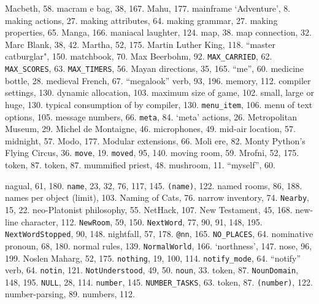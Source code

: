 {{{Macbeth, 58.
macram{ e} bag, 38, 167.
Mahu, 177.
mainframe `Adventure', 8.
making actions, 27.
making attributes, 64.
making grammar, 27.
making properties, 65.
Manga, 166.
maniacal laughter, 124.
map, 38.
map connection, 32.
Marc Blank, 38, 42.
Martha, 52, 175.
Martin Luther King, 118.
``master catburglar", 150.
matchbook, 70.
Max Beerbohm, 92.
{{\tt MAX\_CARRIED}}, 62.
{{\tt MAX\_SCORES}}, 63.
{{\tt MAX\_TIMERS}}, 56.
Mayan directions, 35, 165.
``me'', 60.
medicine bottle, 28.
medieval French, 67.
``megalook'' verb, 93, 196.
memory, 112.
\quad  compiler settings, 130.
\quad  dynamic allocation, 103.
\quad  maximum size of game, 102.
\quad  small, large or huge, 130.
\quad  typical consumption of by compiler, 130.
{{\tt menu\_item}}, 106.
menu of text options, 105.
message numbers, 66.
{{\tt meta}}, 84.
`meta' actions, 26.
Metropolitan Museum, 29.
Michel de Montaigne, 46.
microphones, 49.
mid-air location, 57.
midnight, 57.
Modo, 177.
Modular extensions, 66.
Moli{ e}re, 82.
Monty Python's Flying Circus, 36.
{{\tt move}}, 19.
{{\tt moved}}, 95, 140.
moving room, 59.
Mrofni, 52, 175.
 token, 87.
 token, 87.
mummified priest, 48.
mushroom, 11.
``myself'', 60.

nagual, 61, 180.
{{\tt name}}, 23, 32, 76, 117, 145.
{{\tt (name)}}, 122.
named rooms, 86, 188.
names per object (limit), 103.
Naming of Cats, 76.
narrow inventory, 74.
{{\tt Nearby}}, 15, 22.
neo-Platonist philosophy, 55.
NetHack, 107.
New Testament, 45, 168.
new-line character, 112.
{{\tt NewRoom}}, 59, 150.
{{\tt NextWord}}, 77, 90, 91, 148, 195.
{{\tt NextWordStopped}}, 90, 148.
nightfall, 57, 178.
{{\tt @nn}}, 165.
{{\tt NO\_PLACES}}, 64.
nominative pronoun, 68, 180.
normal rules, 139.
{{\tt NormalWorld}}, 166.
`northness', 147.
nose, 96, 199.
Noslen Maharg, 52, 175.
{{\tt nothing}}, 19, 100, 114.
{{\tt notify\_mode}}, 64.
``notify'' verb, 64.
{{\tt notin}}, 121.
{{\tt NotUnderstood}}, 49, 50.
{{\tt noun}}, 33.
 token, 87.
{{\tt NounDomain}}, 148, 195.
{{\tt NULL}}, 28, 114.
{{\tt number}}, 145.
{{\tt NUMBER\_TASKS}}, 63.
 token, 87.
{{\tt (number)}}, 122.
number-parsing, 89.
numbers, 112.

}}}
